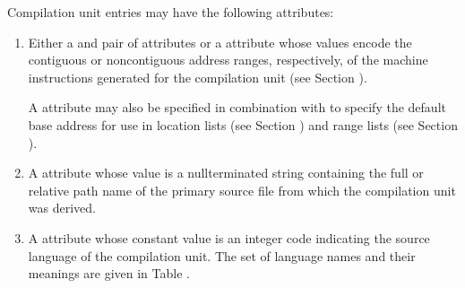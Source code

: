 Compilation unit entries may have the following 
attributes:
\begin{enumerate}[1. ]
\item Either a \DWATlowpc{} and 
\DWAThighpc{} pair of
attributes 
or 
a 
\DWATranges{} attribute
whose values encode 
the
contiguous or 
non\dash contiguous address ranges, respectively,
of the machine instructions generated for the compilation
unit (see Section ).
  
A \DWATlowpc{} attribute 
may also
be specified 
in combination 
with 
\DWATranges{} to specify the
default base address for use in 
location lists (see Section
) and range lists 
(see Section ).

\item A \DWATname{} attribute 
whose value is a null\dash terminated
string 
\hypertarget{chap:DWATnamepathnameofcompilationsource}{}
containing the full or relative path name of the primary
source file from which the compilation unit was derived.

\item A \DWATlanguage{} attribute 
whose constant value is an
\hypertarget{chap:DWATlanguageprogramminglanguage}{}
integer code 
indicating the source language of the compilation
unit. The set of language names and their meanings are given
in Table .


\end{enumerate}
